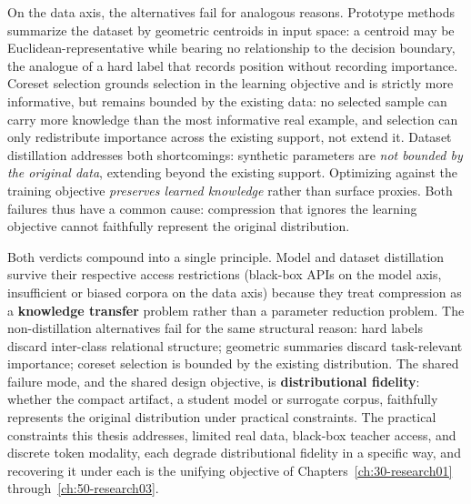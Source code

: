 \begin{foldable}
  On the data axis, the alternatives fail for analogous reasons.
  Prototype methods summarize the dataset by geometric centroids in input space: a centroid may be Euclidean-representative while bearing no relationship to the decision boundary, the analogue of a hard label that records position without recording importance.
  Coreset selection grounds selection in the learning objective and is strictly more informative, but remains bounded by the existing data: no selected sample can carry more knowledge than the most informative real example, and selection can only redistribute importance across the existing support, not extend it.
  Dataset distillation addresses both shortcomings: synthetic parameters are \textit{not bounded by the original data}, extending beyond the existing support.
  Optimizing against the training objective \textit{preserves learned knowledge} rather than surface proxies.
  Both failures thus have a common cause: compression that ignores the learning objective cannot faithfully represent the original distribution.
\end{foldable}

\begin{foldable}
  Both verdicts compound into a single principle.
  Model and dataset distillation survive their respective access restrictions (black-box \acp{API} on the model axis, insufficient or biased corpora on the data axis) because they treat compression as a \textbf{knowledge transfer} problem rather than a parameter reduction problem.
  The non-distillation alternatives fail for the same structural reason: hard labels discard inter-class relational structure; geometric summaries discard task-relevant importance; coreset selection is bounded by the existing distribution.
  The shared failure mode, and the shared design objective, is \textbf{distributional fidelity}: whether the compact artifact, a student model or surrogate corpus, faithfully represents the original distribution under practical constraints.
  The practical constraints this thesis addresses, limited real data, black-box teacher access, and discrete token modality, each degrade distributional fidelity in a specific way, and recovering it under each is the unifying objective of Chapters~\ref{ch:30-research01} through~\ref{ch:50-research03}.
\end{foldable}
